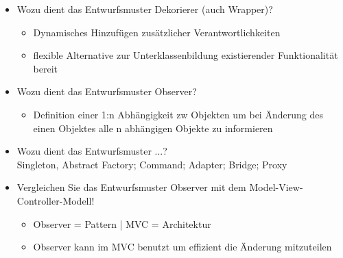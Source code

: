 \begin{itemize}
	\item Wozu dient das Entwurfsmuster Dekorierer (auch Wrapper)?
	\begin{itemize}
		\item Dynamisches Hinzufügen zusätzlicher Verantwortlichkeiten
		\item flexible Alternative zur Unterklassenbildung existierender Funktionalität bereit
	\end{itemize}
	
	\item Wozu dient das Entwurfsmuster Observer?
	\begin{itemize}
		\item Definition einer 1:n Abhängigkeit zw Objekten um bei Änderung des einen Objektes alle n abhängigen Objekte zu informieren
	\end{itemize}
	
	\item Wozu dient das Entwurfsmuster ...?\\
	Singleton, Abstract Factory; Command; Adapter; Bridge; Proxy
	
	\item Vergleichen Sie das Entwurfsmuster Observer mit dem Model-View-Controller-Modell!	\begin{itemize}
		\item Observer = Pattern | MVC = Architektur
		\item Observer kann im MVC benutzt um effizient die Änderung mitzuteilen
	\end{itemize}
\end{itemize}
